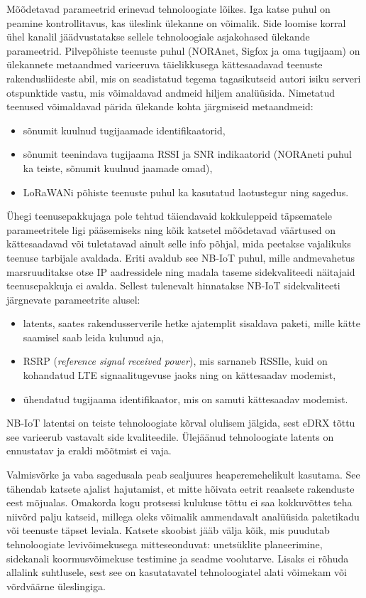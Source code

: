 \documentclass[12pt]{article}
\begin{document}
    Mõõdetavad parameetrid erinevad tehnoloogiate lõikes.
    Iga katse puhul on peamine kontrollitavus, kas üleslink ülekanne on võimalik.
    Side loomise korral ühel kanalil jäädvustatakse sellele tehnoloogiale asjakohased ülekande parameetrid.
    Pilvepõhiste teenuste puhul (NORAnet, Sigfox ja oma tugijaam) on ülekannete metaandmed varieeruva täielikkusega kättesaadavad teenuste rakendusliideste abil, mis on seadistatud tegema tagasikutseid autori isiku serveri otspunktide vastu, mis võimaldavad andmeid hiljem analüüsida.
    Nimetatud teenused võimaldavad pärida ülekande kohta järgmiseid metaandmeid:
    \begin{itemize}
        \item sõnumit kuulnud tugijaamade identifikaatorid,
        \item sõnumit teenindava tugijaama RSSI ja SNR indikaatorid (NORAneti puhul ka teiste, sõnumit kuulnud jaamade omad),
        \item LoRaWANi põhiste teenuste puhul ka kasutatud laotustegur ning sagedus.
    \end{itemize}
    Ühegi teenusepakkujaga pole tehtud täiendavaid kokkuleppeid täpsematele parameetritele ligi pääsemiseks ning kõik katsetel mõõdetavad väärtused on kättesaadavad või tuletatavad ainult selle info põhjal, mida peetakse vajalikuks teenuse tarbijale avaldada.
    Eriti avaldub see NB-IoT puhul, mille andmevahetus marsruuditakse otse IP aadressidele ning madala taseme sidekvaliteedi näitajaid teenusepakkuja ei avalda.
    Sellest tulenevalt hinnatakse NB-IoT sidekvaliteeti järgnevate parameetrite alusel:
    \begin{itemize}
        \item latents, saates rakendusserverile hetke ajatemplit sisaldava paketi, mille kätte saamisel saab leida kulunud aja,
        \item RSRP (\textit{reference signal received power}), mis sarnaneb RSSIle, kuid on kohandatud LTE signaalitugevuse jaoks ning on kättesaadav modemist,
        \item ühendatud tugijaama identifikaator, mis on samuti kättesaadav modemist.
    \end{itemize}
    NB-IoT latentsi on teiste tehnoloogiate kõrval olulisem jälgida, sest eDRX tõttu see varieerub vastavalt side kvaliteedile.
    Ülejäänud tehnoloogiate latents on ennustatav ja eraldi mõõtmist ei vaja.

    Valmisvõrke ja vaba sagedusala peab sealjuures heaperemehelikult kasutama.
    See tähendab katsete ajalist hajutamist, et mitte hõivata eetrit reaalsete rakenduste eest mõjualas.
    Omakorda kogu protsessi kulukuse tõttu ei saa kokkuvõttes teha niivõrd palju katseid, millega oleks võimalik ammendavalt analüüsida paketikadu või teenuste täpset leviala.
    Katsete skoobist jääb välja kõik, mis puudutab tehnoloogiate levivõimekusega mitteseonduvat: unetsüklite planeerimine, sidekanali koormusvõimekuse testimine ja seadme voolutarve.
    Lisaks ei rõhuda allalink suhtlusele, sest see on kasutatavatel tehnoloogiatel alati võimekam või võrdväärne üleslingiga.
\end{document}
